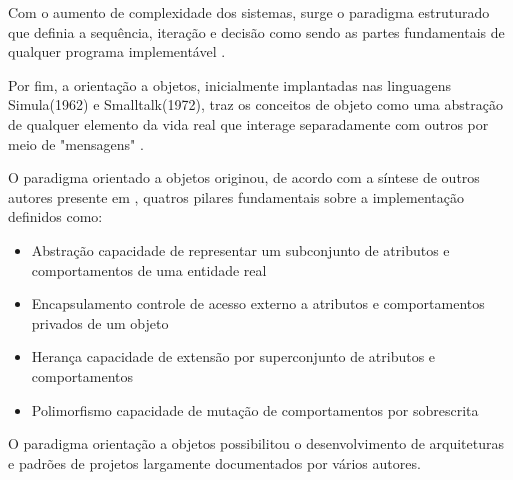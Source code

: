     Com o aumento de complexidade dos sistemas, surge o paradigma estruturado que definia
    a sequência, iteração e decisão como sendo as partes fundamentais de qualquer programa
    implementável \cite{Dijkstra1972structured}.

    Por fim, a orientação a objetos, inicialmente implantadas nas linguagens Simula(1962) e
    Smalltalk(1972), traz os conceitos de objeto como uma abstração de qualquer elemento
    da vida real que interage separadamente com outros por meio de "mensagens"
    \cite[p.~52-55]{rentsch1982object}.

    O paradigma orientado a objetos originou, de acordo com a síntese de outros autores presente em
    , quatros pilares fundamentais sobre a implementação definidos como:

    \begin{itemize}
      \item{ Abstração \- capacidade de representar um subconjunto de atributos e comportamentos de uma entidade real }
      \item{ Encapsulamento \- controle de acesso externo a atributos e comportamentos privados de um objeto }
      \item{ Herança \- capacidade de extensão por superconjunto de atributos e comportamentos }
      \item{ Polimorfismo \- capacidade de mutação de comportamentos por sobrescrita }
    \end{itemize}

    O paradigma orientação a objetos possibilitou o desenvolvimento de arquiteturas e padrões
    de projetos largamente documentados por vários autores.




%
%
%     
%
%




    
\newpage

